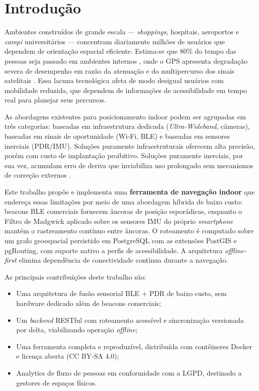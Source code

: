 \documentclass[12pt]{article}
\begin{document}
\section{Introdução}

Ambientes construídos de grande escala — \textit{shoppings}, hospitais, aeroportos
e \textit{campi} universitários — concentram diariamente milhões de usuários que
dependem de orientação espacial eficiente. Estima-se que 80\% do tempo das pessoas
seja passado em ambientes internos \cite{Zafari2019}, onde o GPS apresenta degradação
severa de desempenho em razão da atenuação e do multipercurso dos sinais satelitais
\cite{Liu2007}. Essa lacuna tecnológica afeta de modo desigual usuários com mobilidade
reduzida, que dependem de informações de acessibilidade em tempo real para planejar
seus percursos.

As abordagens existentes para posicionamento indoor podem ser agrupadas em três
categorias: baseadas em infraestrutura dedicada (\textit{Ultra-Wideband}, câmeras),
baseadas em sinais de oportunidade (Wi-Fi, BLE) e baseadas em sensores inerciais
(PDR/IMU). Soluções puramente infraestruturais oferecem alta precisão, porém com
custo de implantação proibitivo. Soluções puramente inerciais, por sua vez, acumulam
erro de deriva que inviabiliza uso prolongado sem mecanismos de correção externos
\cite{Jimenez2009}.

Este trabalho propõe e implementa uma \textbf{ferramenta de navegação indoor} que
endereça essas limitações por meio de uma abordagem híbrida de baixo custo: beacons
BLE comerciais fornecem âncoras de posição esporádicas, enquanto o Filtro de Madgwick
aplicado sobre os sensores IMU do próprio \textit{smartphone} mantém o rastreamento
contínuo entre âncoras. O roteamento é computado sobre um grafo geoespacial persistido
em PostgreSQL com as extensões PostGIS e pgRouting, com suporte nativo a perfis de
acessibilidade. A arquitetura \textit{offline-first} elimina dependência de conectividade
contínua durante a navegação.

As principais contribuições deste trabalho são:
\begin{itemize}
  \item Uma arquitetura de fusão sensorial BLE + PDR de baixo custo, sem hardware
        dedicado além de beacons comerciais;
  \item Um \textit{backend} RESTful com roteamento acessível e sincronização versionada
        por delta, viabilizando operação \textit{offline};
  \item Uma ferramenta completa e reproduzível, distribuída com contêineres Docker
        e licença aberta (CC BY-SA 4.0);
  \item Analytics de fluxo de pessoas em conformidade com a LGPD, destinado a
        gestores de espaços físicos.
\end{itemize}
\end{document}
